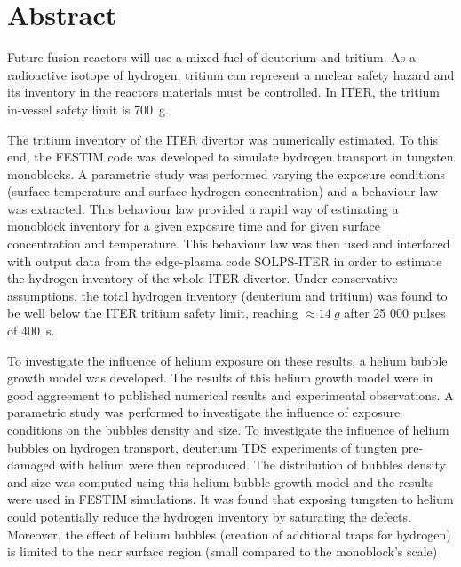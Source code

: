 \chapter*{Abstract}

Future fusion reactors will use a mixed fuel of deuterium and tritium.
As a radioactive isotope of hydrogen, tritium can represent a nuclear safety hazard and its inventory in the reactors materials must be controlled.
In ITER, the tritium in-vessel safety limit is \SI{700}{g}.

The tritium inventory of the ITER divertor was numerically estimated.
To this end, the FESTIM code was developed to simulate hydrogen transport in tungsten monoblocks.
A parametric study was performed varying the exposure conditions (surface temperature and surface hydrogen concentration) and a behaviour law was extracted.
This behaviour law provided a rapid way of estimating a monoblock inventory for a given exposure time and for given surface concentration and temperature.
This behaviour law was then used and interfaced with output data from the edge-plasma code SOLPS-ITER in order to estimate the hydrogen inventory of the whole ITER divertor.
Under conservative assumptions, the total hydrogen inventory (deuterium and tritium) was found to be well below the ITER tritium safety limit, reaching $\approx \SI{14}{g}$ after 25 000 pulses of \SI{400}{s}.

To investigate the influence of helium exposure on these results, a helium bubble growth model was developed.
The results of this helium growth model were in good aggreement to published numerical results and experimental observations.
A parametric study was performed to investigate the influence of exposure conditions on the bubbles density and size.
To investigate the influence of helium bubbles on hydrogen transport, deuterium TDS experiments of tungten pre-damaged with helium were then reproduced.
The distribution of bubbles density and size was computed using this helium bubble growth model and the results were used in FESTIM simulations.
It was found that exposing tungsten to helium could potentially reduce the hydrogen inventory by saturating the defects.
Moreover, the effect of helium bubbles (creation of additional traps for hydrogen) is limited to the near surface region (small compared to the monoblock's scale)
